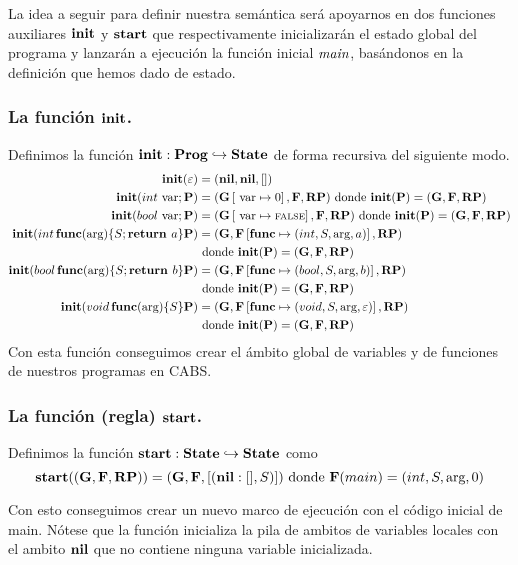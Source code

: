 La idea a seguir para definir nuestra semántica será apoyarnos en dos funciones auxiliares $\textbf{init}$ y $\textbf{start}$ que respectivamente inicializarán el estado global del programa y lanzarán a ejecución la función inicial $\textit{main}$, basándonos en la definición que hemos dado de estado.

\subsubsection{La función $\textbf{init}$.}
Definimos la función $\textbf{init}: \textbf{Prog} \hookrightarrow \textbf{State}$ de forma recursiva del siguiente modo.
\begin{align*}
  \textbf{init}(\varepsilon) &= (\textbf{nil}, \textbf{nil}, [])\\
  \textbf{init}(int \text{ var} \mbox{;\,} \mathbf{P}) &= (\mathbf{G}\left[ \text{ var}\mapsto0 \right], \mathbf{F}, \textbf{RP}) \text{ donde } \textbf{init}(\mathbf{P}) = (\mathbf{G}, \mathbf{F}, \textbf{RP})\\
  \textbf{init}(bool \text{ var} \mbox{;\,} \mathbf{P}) &= (\mathbf{G}\left[ \text{ var}\mapsto\text{\scriptsize{FALSE}} \right], \mathbf{F}, \textbf{RP}) \text{ donde } \textbf{init}(\mathbf{P}) = (\mathbf{G}, \mathbf{F}, \textbf{RP})\\
  \textbf{init}(int \, \textbf{func}(\text{arg}) \{ S\mbox{;\,} \textbf{return } a\} \mathbf{P}) &= (\mathbf{G}, \mathbf{F}\left[ \textbf{func}\mapsto(int, S, \text{arg}, a) \right], \textbf{RP}) \\ &\text{ donde } \textbf{init}(\mathbf{P}) = (\mathbf{G}, \mathbf{F}, \textbf{RP})\\
  \textbf{init}(bool \, \textbf{func}(\text{arg}) \{ S\mbox{;\,} \textbf{return } b\} \mathbf{P}) &= (\mathbf{G}, \mathbf{F}\left[ \textbf{func}\mapsto(bool, S, \text{arg}, b) \right], \textbf{RP}) \\ &\text{ donde } \textbf{init}(\mathbf{P}) = (\mathbf{G}, \mathbf{F}, \textbf{RP})\\
  \textbf{init}(void \, \textbf{func}(\text{arg}) \{ S\} \mathbf{P}) &= (\mathbf{G}, \mathbf{F}\left[ \textbf{func}\mapsto(void, S, \text{arg}, \varepsilon) \right], \textbf{RP}) \\ &\text{ donde } \textbf{init}(\mathbf{P}) = (\mathbf{G}, \mathbf{F}, \textbf{RP})\\
\end{align*}
Con esta función conseguimos crear el ámbito global de variables y de funciones de nuestros programas en CABS.

\subsubsection{La función (regla) $\textbf{start}$.}
Definimos la función $\textbf{start}: \textbf{State} \hookrightarrow \textbf{State}$ como
$$
\textbf{start}((\mathbf{G}, \mathbf{F}, \textbf{RP})) = (\mathbf{G}, \mathbf{F}, [(\textbf{nil}:[], S)]) \text{ donde } \mathbf{F}(main) = (int, S, \text{arg}, 0)
$$

Con esto conseguimos crear un nuevo marco de ejecución con el código inicial de main. Nótese que la función inicializa la pila de ambitos de variables locales con el ambito $\textbf{nil}$ que no contiene ninguna variable inicializada.

